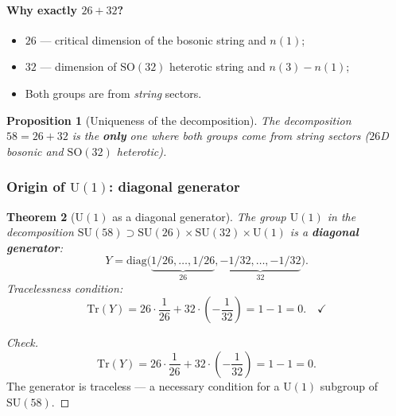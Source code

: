 \documentclass[11pt,a4paper]{article}
\newcommand{\SU}{\mathrm{SU}}
\newcommand{\SO}{\mathrm{SO}}
\newtheorem{theorem}{Theorem}[section]
\newtheorem{proposition}[theorem]{Proposition}
\theoremstyle{definition}
\begin{document}
\paragraph{Why exactly $26 + 32$?}
\begin{itemize}
    \item $26$ — critical dimension of the bosonic string 
          and $n(1)$;
    \item $32$ — dimension of $\SO(32)$ heterotic string 
          and $n(3) - n(1)$;
    \item Both groups are from \emph{string} sectors.
\end{itemize}

\begin{proposition}[Uniqueness of the decomposition]
\label{prop:unique-decomposition}
The decomposition $58 = 26 + 32$ is the \textbf{only} one where both groups 
come from string sectors ($26$D bosonic and $\SO(32)$ 
heterotic).
\end{proposition}

\subsubsection{Origin of \texorpdfstring{$\mathrm{U}(1)$}{U(1)}: diagonal generator}
\label{subsubsec:u1-diagonal}

\begin{theorem}[$\mathrm{U}(1)$ as a diagonal generator]
\label{thm:u1-diagonal}
The group $\mathrm{U}(1)$ in the decomposition
$\SU(58) \supset \SU(26) \times \SU(32) \times \mathrm{U}(1)$
is a \textbf{diagonal generator}:
\begin{equation}
    \boxed{
    Y = \mathrm{diag}\bigl(
    \underbrace{1/26, \ldots, 1/26}_{26},
    \underbrace{-1/32, \ldots, -1/32}_{32}
    \bigr).
    }
    \label{eq:u1-diag}
\end{equation}
Tracelessness condition:
\begin{equation}
    \mathrm{Tr}(Y) = 26 \cdot \frac{1}{26} + 32 \cdot \left(-\frac{1}{32}\right)
    = 1 - 1 = 0. \quad \checkmark
\end{equation}
\end{theorem}

\begin{proof}[Check]
\begin{equation}
    \mathrm{Tr}(Y) = 26 \cdot \frac{1}{26} + 32 \cdot \left(-\frac{1}{32}\right)
    = 1 - 1 = 0.
\end{equation}
The generator is traceless — a necessary condition for a
$\mathrm{U}(1)$ subgroup of $\SU(58)$.
\end{proof}
\end{document}
